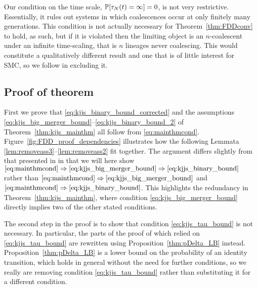Our condition on the time scale, $\mathbb{P}[ \tau_N(t) = \infty ] =0$, is not very restrictive. Essentially, it rules out systems in which coalescences occur at only finitely many generations. 
This condition is not actually necessary for Theorem~\ref{thm:FDDconv} to hold, as such, but if it is violated then the limiting object is an $n$-coalescent under an infinite time-scaling, that is $n$ lineages never coalescing.
This would constitute a qualitatively different result and one that is of little interest for SMC, so we follow \textcite{mohle1998} in excluding it.


\subsection{Proof of theorem}

First we prove that \eqref{eq:kjjs_binary_bound_corrected} and the assumptions \eqref{eq:kjjs_big_merger_bound}--\eqref{eq:kjjs_binary_bound_2} of Theorem~\ref{thm:kjjs_mainthm} all follow from \eqref{eq:mainthmcond}.
Figure~\ref{fig:FDD_proof_dependencies} illustrates how the following Lemmata \ref{lem:removeass3}--\ref{lem:removeass2} fit together. 
The argument differs slightly from that presented in \textcite{brown2021} in that we will here show $\eqref{eq:mainthmcond} \Rightarrow \eqref{eq:kjjs_big_merger_bound} \Rightarrow \eqref{eq:kjjs_binary_bound}$ rather than $\eqref{eq:mainthmcond} \Rightarrow \eqref{eq:kjjs_big_merger_bound}$ and $\eqref{eq:mainthmcond} \Rightarrow \eqref{eq:kjjs_binary_bound}$.
This highlights the redundancy in Theorem~\ref{thm:kjjs_mainthm}, where condition \eqref{eq:kjjs_big_merger_bound} directly implies two of the other stated conditions.

The second step in the proof is to show that condition \eqref{eq:kjjs_tau_bound} is not necessary. In particular, the parts of the proof of \textcite{koskela2018} which relied on \eqref{eq:kjjs_tau_bound} are rewritten using Proposition~\ref{thm:pDelta_LB} instead. 
Proposition~\ref{thm:pDelta_LB} is a lower bound on the probability of an identity transition, which holds in general without the need for further conditions, so we really are removing condition \eqref{eq:kjjs_tau_bound} rather than substituting it for a different condition.


